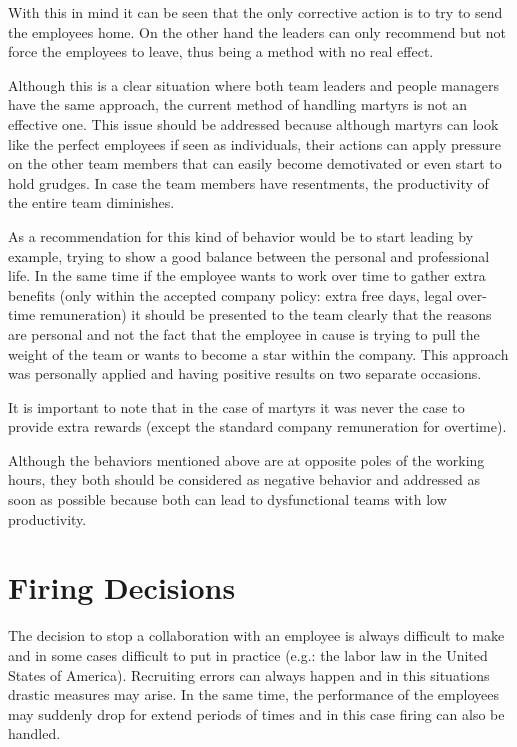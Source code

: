 With this in mind it can be seen that the only corrective action is to try to send the employees home. On the other hand the leaders can only recommend but not force the employees to leave, thus being a method with no real effect. 

Although this is a clear situation where both team leaders and people managers have the same approach, the current method of handling martyrs is not an effective one. This issue should be addressed because although martyrs can look like the perfect employees if seen as individuals, their actions can apply pressure on the other team members that can easily become demotivated or even start to hold grudges. In case the team members have resentments, the productivity of the entire team diminishes. 

As a recommendation for this kind of behavior would be to start leading by example, trying to show a good balance between the personal and professional life. In the same time if the employee wants to work over time to gather extra benefits (only within the accepted company policy: extra free days, legal over-time remuneration) it should be presented to the team clearly that the reasons are personal and not the fact that the employee in cause is trying to pull the weight of the team or wants to become a star within the company. This approach was personally applied and having positive results on two separate occasions.

It is important to note that in the case of martyrs it was never the case to provide extra rewards (except the standard company remuneration for overtime).

Although the behaviors mentioned above are at opposite poles of the working hours, they both should be considered as negative behavior and addressed as soon as possible because both can lead to dysfunctional teams with low productivity.

\section{Firing Decisions}
\label{sec:firing}
The decision to stop a collaboration with an employee is always difficult to make and in some cases difficult to put in practice (e.g.: the labor law in the United States of America). Recruiting errors can always happen and in this situations drastic measures may arise. In the same time, the performance of the employees may suddenly drop for extend periods of times and in this case firing can also be handled. 

